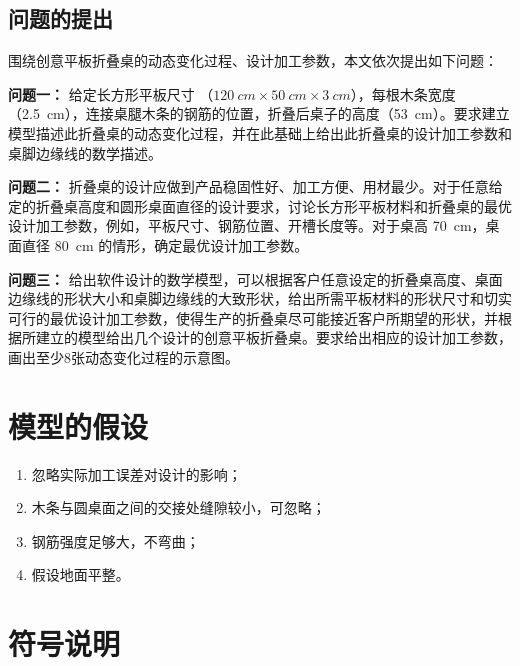 \documentclass[bwprint]{gmcmthesis}
\begin{document}
\subsection{问题的提出}


\noindent 围绕创意平板折叠桌的动态变化过程、设计加工参数，本文依次提出如下问题：

\textbf{问题一：} 给定长方形平板尺寸 （$\SI{120}{cm} \times \SI{50}{cm} \times \SI{3}{cm}$），每根木条宽度（\SI{2.5}{cm}），连接桌腿木条的钢筋的位置，折叠后桌子的高度（\SI{53}{cm}）。要求建立模型描述此折叠桌的动态变化过程，并在此基础上给出此折叠桌的设计加工参数和桌脚边缘线的数学描述。


\textbf{问题二：} 折叠桌的设计应做到产品稳固性好、加工方便、用材最少。对于任意给定的折叠桌高度和圆形桌面直径的设计要求，讨论长方形平板材料和折叠桌的最优设计加工参数，例如，平板尺寸、钢筋位置、开槽长度等。对于桌高 \SI{70}{cm}，桌面直径 \SI{80}{cm} 的情形，确定最优设计加工参数。


\textbf{问题三：} 给出软件设计的数学模型，可以根据客户任意设定的折叠桌高度、桌面边缘线的形状大小和桌脚边缘线的大致形状，给出所需平板材料的形状尺寸和切实可行的最优设计加工参数，使得生产的折叠桌尽可能接近客户所期望的形状，并根据所建立的模型给出几个设计的创意平板折叠桌。要求给出相应的设计加工参数，画出至少8张动态变化过程的示意图。



\clearpage
\section{模型的假设}

\begin{enumerate}
\item 忽略实际加工误差对设计的影响；
\item 木条与圆桌面之间的交接处缝隙较小，可忽略；
\item 钢筋强度足够大，不弯曲；
\item 假设地面平整。
\end{enumerate}


\section{符号说明}
\end{document}
